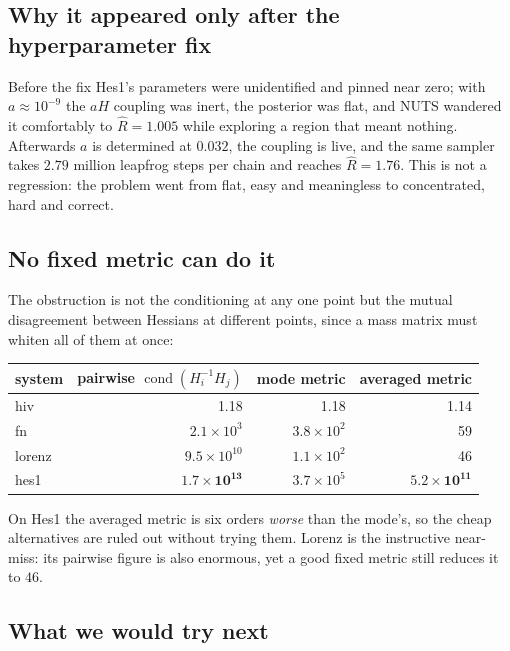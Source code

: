 \documentclass[11pt]{article}
\newcommand{\Rhat}{\widehat{R}}
\theoremstyle{plain}
\theoremstyle{definition}
\theoremstyle{remark}
\begin{document}
\subsection{Why it appeared only after the hyperparameter fix}

Before the fix Hes1's parameters were unidentified and pinned near zero; with $a \approx 10^{-9}$
the $aH$ coupling was inert, the posterior was flat, and NUTS wandered it comfortably to
$\Rhat = 1.005$ while exploring a region that meant nothing. Afterwards $a$ is determined at
$0.032$, the coupling is live, and the same sampler takes $2.79$ million leapfrog steps per chain
and reaches $\Rhat = 1.76$. This is not a regression: the problem went from flat, easy and
meaningless to concentrated, hard and correct.

\subsection{No fixed metric can do it}

The obstruction is not the conditioning at any one point but the mutual disagreement between
Hessians at different points, since a mass matrix must whiten all of them at once:

\begin{center}\small
\begin{tabular}{lrrr}
\toprule
system & pairwise $\operatorname{cond}(H_i^{-1}H_j)$ & mode metric & averaged metric\\
\midrule
hiv    & 1.18 & 1.18 & 1.14\\
fn     & $2.1\times10^{3}$ & $3.8\times10^{2}$ & 59\\
lorenz & $9.5\times10^{10}$ & $1.1\times10^{2}$ & 46\\
hes1   & $\mathbf{1.7\times10^{13}}$ & $3.7\times10^{5}$ & $\mathbf{5.2\times10^{11}}$\\
\bottomrule
\end{tabular}
\end{center}

On Hes1 the averaged metric is six orders \emph{worse} than the mode's, so the cheap alternatives
are ruled out without trying them. Lorenz is the instructive near-miss: its pairwise figure is also
enormous, yet a good fixed metric still reduces it to $46$.

\subsection{What we would try next}
\end{document}
